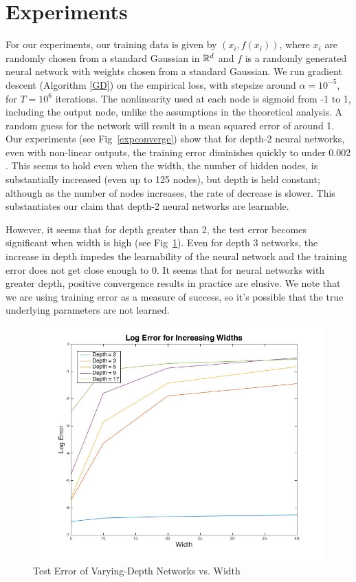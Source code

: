 

\section{Experiments}
\label{experiments}
For our experiments, our training data is given by $(x_i, f(x_i))$, where $x_i$ are randomly chosen from a standard Gaussian in ${\mathbb{R}}^d$ and $f$ is a randomly generated neural network with weights chosen from a standard Gaussian. We run gradient descent (Algorithm \ref{GD}) on the empirical loss, with stepsize around $\alpha = 10^{-5}$, for $T = 10^6$ iterations. The nonlinearity used at each node is sigmoid from -1 to 1, including the output node, unlike the assumptions in the theoretical analysis. A random guess for the network will result in a mean squared error of around 1. Our experiments (see Fig~\ref{expconverge}) show that for depth-2 neural networks, even with non-linear outputs, the training error diminishes quickly to under $0.002$. This seems to hold even when the width, the number of hidden nodes, is substantially increased (even up to 125 nodes), but depth is held constant; although as the number of nodes increases, the rate of decrease is slower. This substantiates our claim that depth-2 neural networks are learnable.

However, it seems that for depth greater than 2, the test error becomes significant  when width is high (see Fig~\ref{tablePlot}). Even for depth 3 networks, the increase in depth impedes the learnability of the neural network and the training error does not get close enough to 0. It seems that for neural networks with greater depth, positive convergence results in practice are elusive. We note that we are using training error as a measure of success, so it's possible that the true underlying parameters are not learned. 

\begin{figure}[!ht]
  \centering
\includegraphics[width = 4.5in]{tablePlot.jpg}
\caption{Test Error of Varying-Depth Networks vs. Width}
\label{tablePlot}
\end{figure}

